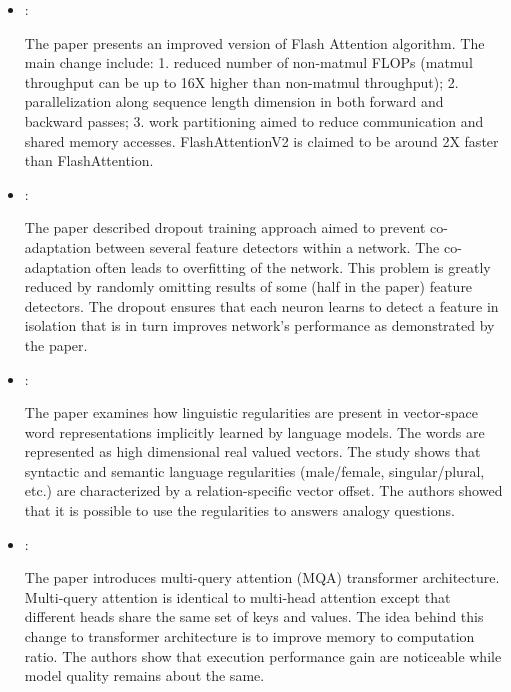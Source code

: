 \begin{itemize}
    \item \cite{Dao:FlashAttentionV2:2023}:

    The paper presents an improved version of Flash Attention algorithm. The main change include: 1. reduced number of non-matmul FLOPs (matmul throughput can be up to 16X higher than non-matmul throughput); 2. parallelization along sequence length dimension in both forward and backward passes; 3. work partitioning aimed to reduce communication and shared memory accesses. FlashAttentionV2 is claimed to be around 2X faster than FlashAttention.

    \item \cite{Hinton:Dropout:2012}:

    The paper described dropout training approach aimed to prevent co-adaptation between several feature detectors within a network. The co-adaptation often leads to overfitting of the network. This problem is greatly reduced by randomly omitting results of some (half in the paper) feature detectors. The dropout ensures that each neuron learns to detect a feature in isolation that is in turn improves network's performance as demonstrated by the paper.

    \item \cite{Mikolov:LinguisticRI:2013}:

    The paper examines how linguistic regularities are present in vector-space word representations implicitly learned by language models. The words are represented as high dimensional real valued vectors. The study shows that syntactic and semantic language regularities (male/female, singular/plural, etc.) are characterized by a relation-specific vector offset. The authors showed that it is possible to use the regularities to answers analogy questions.

    \item \cite{Shazeer:MQA:2019}:

    The paper introduces multi-query attention (MQA) transformer architecture. Multi-query attention is identical to multi-head attention except that different heads share the same set of keys and values. The idea behind this change to transformer architecture is to improve memory to computation ratio. The authors show that execution performance gain are noticeable while model quality remains about the same.
\end{itemize}


